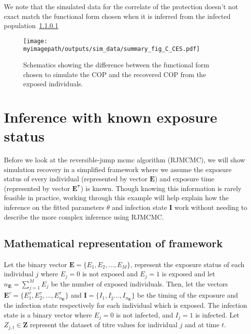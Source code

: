 \documentclass{article}
\newcommand{\myimagepath}{/Users/davidhodgson/Dropbox/Mac (3)/Documents/research/Rpackages/rjmc/}
\begin{document}
We note that the simulated data for the correlate of the protection doesn't not exact match the functional form chosen when it is inferred from the infected population~\ref{}

\begin{figure}[h]
    \centering
    \texttt{[image: \\myimagepath/outputs/sim\_data/summary\_fig\_C\_CES.pdf]}     \caption{Schematics showing the difference between the functional form chosen to simulate the COP and the recovered COP from the exposed individuals.   }
    \label{fig:sim_C}
\end{figure}



\newpage
\newpage

\section{Inference with known exposure status}

\paragraph{}Before we look at the reversible-jump mcmc algorithm (RJMCMC), we will show simulation recovery in a simplified framework where we assume the exposure status of every individual (represented by vector $\mathbf{E}$) and exposure time (represented by vector $\mathbf{E^\tau}$) is known. Though knowing this information is rarely feasible in practice, working through this example will help explain how the inference on the fitted parameters $\theta$ and infection state $\mathbf{I}$ work without needing to describe the more complex inference using RJMCMC. 

\subsection{Mathematical representation of framework}

\paragraph{}Let the binary vector $\mathbf{E} = \{ E_1, E_2, \dots, E_M\}$, represent the exposure status of each individual $j$ where $E_j = 0$ is not exposed and $E_j = 1$ is exposed and let $n_\mathbf{E} = \sum_{j = 1}^ME_j$ be the number of exposed individuals. Then, let the vectors $\mathbf{E}^\tau = \{E_1^\tau, E_2^\tau, \dots, E^\tau_{n_\mathbf{E}}\}$ and $\mathbf{I} = \{I_1, I_2^, \dots, I_{n_\mathbf{E}}\}$ be the timing of the exposure and the infection state respectively for each individual which is exposed. The infection state is a binary vector where $E_j = 0$ is not infected, and $I_j = 1$ is infected. Let $Z_{j, t} \in \mathbf{Z}$ represent the dataset of titre values for individual $j$ and at time $t$. 
\end{document}
